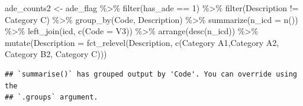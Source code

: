 \documentclass[preprint, 3p,
authoryear]{elsarticle} %
\newenvironment{Shaded}{\begin{snugshade}}{\end{snugshade}}
\newcommand{\AttributeTok}[1]{\textcolor[rgb]{0.77,0.63,0.00}{#1}}
\newcommand{\DecValTok}[1]{\textcolor[rgb]{0.00,0.00,0.81}{#1}}
\newcommand{\FunctionTok}[1]{\textcolor[rgb]{0.00,0.00,0.00}{#1}}
\newcommand{\NormalTok}[1]{#1}
\newcommand{\OtherTok}[1]{\textcolor[rgb]{0.56,0.35,0.01}{#1}}
\newcommand{\SpecialCharTok}[1]{\textcolor[rgb]{0.00,0.00,0.00}{#1}}
\newcommand{\StringTok}[1]{\textcolor[rgb]{0.31,0.60,0.02}{#1}}
\begin{document}
\begin{Shaded}
\begin{Highlighting}[]
\NormalTok{ade\_counts2 }\OtherTok{\textless{}{-}}\NormalTok{ ade\_flag }\SpecialCharTok{\%\textgreater{}\%}
  \FunctionTok{filter}\NormalTok{(has\_ade }\SpecialCharTok{==} \DecValTok{1}\NormalTok{) }\SpecialCharTok{\%\textgreater{}\%}
  \FunctionTok{filter}\NormalTok{(Description }\SpecialCharTok{!=} \StringTok{\textquotesingle{}Category C\textquotesingle{}}\NormalTok{) }\SpecialCharTok{\%\textgreater{}\%}
  \FunctionTok{group\_by}\NormalTok{(Code, Description) }\SpecialCharTok{\%\textgreater{}\%}
  \FunctionTok{summarize}\NormalTok{(}\AttributeTok{n\_icd =} \FunctionTok{n}\NormalTok{()) }\SpecialCharTok{\%\textgreater{}\%}
  \FunctionTok{left\_join}\NormalTok{(icd, }\FunctionTok{c}\NormalTok{(}\StringTok{\textquotesingle{}Code\textquotesingle{}} \OtherTok{=} \StringTok{\textquotesingle{}V3\textquotesingle{}}\NormalTok{)) }\SpecialCharTok{\%\textgreater{}\%}
  \FunctionTok{arrange}\NormalTok{(}\FunctionTok{desc}\NormalTok{(n\_icd)) }\SpecialCharTok{\%\textgreater{}\%}
  \FunctionTok{mutate}\NormalTok{(}\AttributeTok{Description =} \FunctionTok{fct\_relevel}\NormalTok{(Description, }\FunctionTok{c}\NormalTok{(}\StringTok{\textquotesingle{}Category A1\textquotesingle{}}\NormalTok{,}\StringTok{\textquotesingle{}Category A2\textquotesingle{}}\NormalTok{, }\StringTok{\textquotesingle{}Category B2\textquotesingle{}}\NormalTok{, }\StringTok{\textquotesingle{}Category C\textquotesingle{}}\NormalTok{)))}
\end{Highlighting}
\end{Shaded}

\begin{verbatim}
## `summarise()` has grouped output by 'Code'. You can override using the
## `.groups` argument.
\end{verbatim}
\end{document}
